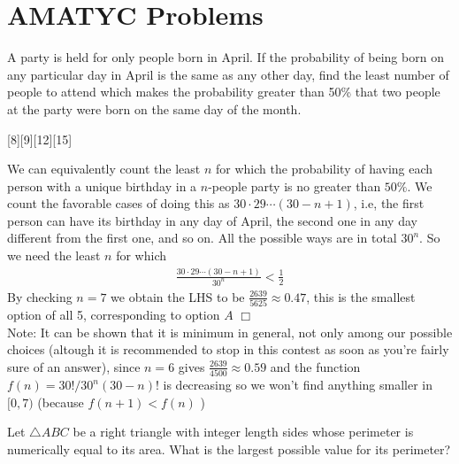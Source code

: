 




\sloppy
\maketitle

\section{AMATYC Problems}

\begin{problem}
    A party is held for only people born in April. If the probability of being born on any particular day in April is the same as any other day, find the least number of people to attend which makes the probability greater than 50\% that two people at the party were born on the same day of the month.
\end{problem}
[8][9][12][15]

\begin{solution}[A]
    We can equivalently count the least $n$ for which the probability of having each person with a unique birthday in a $n$-people party is no greater than $50\%$.
    We count the favorable cases of doing this as $30 \cdot 29 \cdots (30-n+1)$, i.e, the first person can have its birthday in any day of April, the second one in any day different from the first one, and so on. All the possible ways are in total $30^n$. So we need the least $n$ for which
    \begin{align*}
        \frac{30 \cdot 29 \cdots (30-n+1)}{30^n} < \frac{1}{2}
    \end{align*}
    By checking $n=7$ we obtain the LHS to be $\frac{2639}{5625} \approx 0.47$, this is the smallest option of all 5, corresponding to option $A$ $\Box$ \\[3mm]
    Note: It can be shown that it is minimum in general, not only among our possible choices (altough it is recommended to stop in this contest as soon as you're fairly sure of an answer), since  $n=6$ gives $\frac{2639}{4500} \approx 0.59$ and the function $f(n) = 30!/30^n(30-n)!$ is decreasing so we won't find anything smaller in $[0,7)$ (because $f(n+1) < f(n)$ )
\end{solution}

\begin{problem}[N][4][AMATYC Fall 2015/11]
    Let $\triangle ABC$ be a right triangle with integer length sides whose perimeter is numerically equal to its area. What is the largest possible value for its perimeter?
\end{problem}

